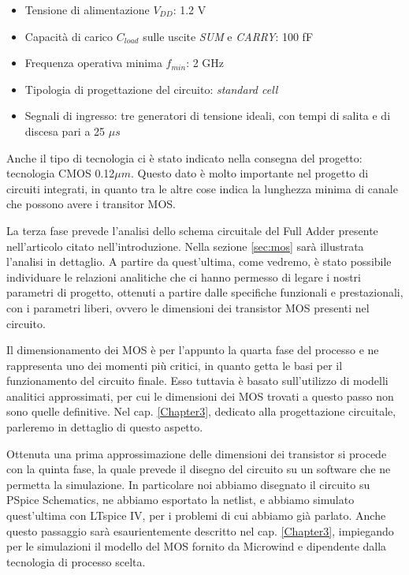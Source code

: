 \begin{itemize}
	\item Tensione di alimentazione $V _{DD}$: 1.2 V
	\item Capacità di carico $C _{load}$ sulle uscite \textit{SUM} e \textit{CARRY}: 100 fF
	\item Frequenza operativa minima $f _{min}$: 2 GHz
	\item Tipologia di progettazione del circuito: \textit{standard cell}
	\item Segnali di ingresso: tre generatori di tensione ideali, con tempi di salita e di discesa pari a 25 $\mu s$
\end{itemize}

Anche il tipo di tecnologia ci è stato indicato nella consegna del progetto: tecnologia CMOS 0.12$\mu m$. Questo dato è molto importante nel progetto di circuiti integrati, in quanto tra le altre cose indica la lunghezza minima di canale che possono avere i transitor MOS.

La terza fase prevede l'analisi dello schema circuitale del Full Adder presente nell'articolo citato nell'introduzione. Nella sezione \ref{sec:mos} sarà illustrata l'analisi in dettaglio. A partire da quest'ultima, come vedremo, è stato possibile individuare le relazioni analitiche che ci hanno permesso di legare i nostri parametri di progetto, ottenuti a partire dalle specifiche funzionali e prestazionali, con i parametri liberi, ovvero le dimensioni dei transistor MOS presenti nel circuito. 

Il dimensionamento dei MOS è per l'appunto la quarta fase del processo e ne rappresenta uno dei momenti più critici, in quanto getta le basi per il funzionamento del circuito finale. Esso tuttavia è basato sull'utilizzo di modelli analitici approssimati, per cui le dimensioni dei MOS trovati a questo passo non sono quelle definitive. Nel cap. \ref{Chapter3}, dedicato alla progettazione circuitale, parleremo in dettaglio di questo aspetto.

Ottenuta una prima approssimazione delle dimensioni dei transistor si procede con la quinta fase, la quale prevede il disegno del circuito su un software che ne permetta la simulazione. In particolare noi abbiamo disegnato il circuito su PSpice Schematics, ne abbiamo esportato la netlist, e abbiamo simulato quest'ultima con LTspice IV, per i problemi di cui abbiamo già parlato. Anche questo passaggio sarà esaurientemente descritto nel cap. \ref{Chapter3}, impiegando per le simulazioni il modello del MOS fornito da Microwind e dipendente dalla tecnologia di processo scelta. 

